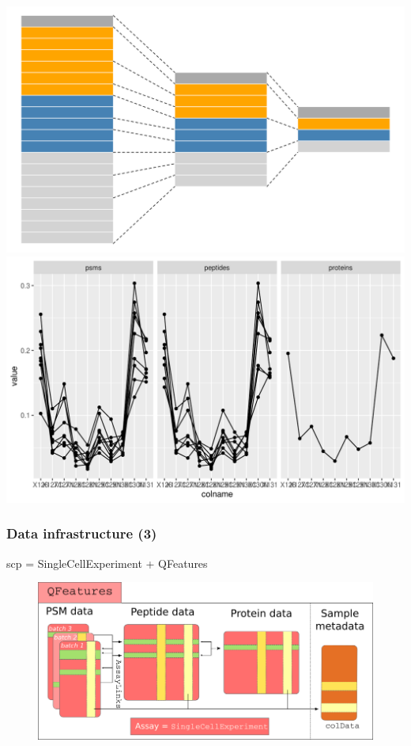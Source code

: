 \documentclass{beamer}
\newcommand{\hcode}[2][lgray]{{\ttfamily\color{vdgray}\colorbox{#1}{#2}}}
\newcommand{\frametitlesection}[1]{\frametitle{\centering #1 \footnotesize \hspace{0pt plus 1 filll} \insertsection}}
\begin{document}
\begin{frame}
    \includegraphics[width=0.45\linewidth]{figs/QFeatures.png}
    \includegraphics[width=0.53\linewidth]{figs/QFeatures_data.png}
    
\end{frame}


\begin{frame}
    \frametitlesection{Data infrastructure (3)}

    \hcode{scp} = \hcode{SingleCellExperiment} + \hcode{QFeatures}
    \begin{figure}
        \centering
        \includegraphics[width=.9\linewidth]{figs/SCP_framework.png}
    \end{figure}

    
\end{frame}
\end{document}
